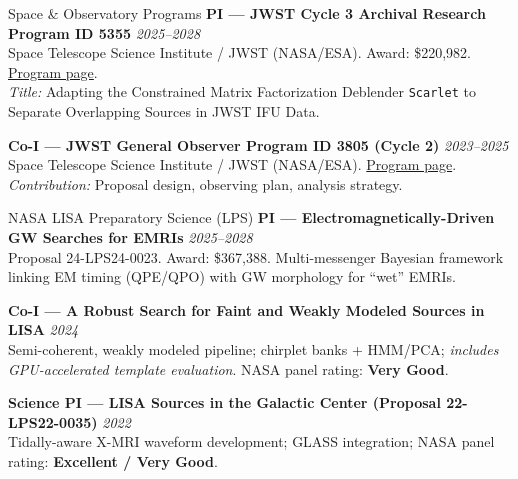 \documentclass{resume}
\begin{document}
\begin{rSection}{Space \& Observatory Programs}\vspace{0.4cm}
{\bf PI — JWST Cycle 3 Archival Research Program ID 5355} \hfill {\em 2025--2028}\\
Space Telescope Science Institute / JWST (NASA/ESA). Award: \$220,982. \href{https://www.stsci.edu/jwst/science-execution/program-information?id=5355}{Program page}.\\
{\it Title:} Adapting the Constrained Matrix Factorization Deblender \texttt{Scarlet} to Separate Overlapping Sources in JWST IFU Data.

{\bf Co-I — JWST General Observer Program ID 3805 (Cycle 2)} \hfill {\em 2023--2025}\\
Space Telescope Science Institute / JWST (NASA/ESA). \href{https://www.stsci.edu/jwst/science-execution/program-information?id=3805}{Program page}.\\
{\it Contribution:} Proposal design, observing plan, analysis strategy.
\end{rSection}

\begin{rSection}{NASA LISA Preparatory Science (LPS)}\vspace{0.4cm}
{\bf PI — Electromagnetically-Driven GW Searches for EMRIs} \hfill {\em 2025--2028}\\
Proposal 24-LPS24-0023. Award: \$367,388.
Multi-messenger Bayesian framework linking EM timing (QPE/QPO) with GW morphology for ``wet'' EMRIs.

{\bf Co-I — A Robust Search for Faint and Weakly Modeled Sources in LISA} \hfill {\em 2024}\\
Semi-coherent, weakly modeled pipeline; chirplet banks + HMM/PCA; {\it includes GPU-accelerated template evaluation}. NASA panel rating: {\bf Very Good}.

{\bf Science PI — LISA Sources in the Galactic Center (Proposal 22-LPS22-0035)} \hfill {\em 2022}\\
Tidally-aware X-MRI waveform development; GLASS integration; NASA panel rating: {\bf Excellent / Very Good}.
\end{rSection}
\end{document}
